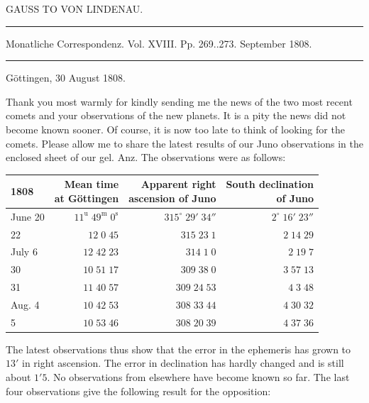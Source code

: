 \begin{center}
GAUSS TO VON LINDENAU.
\end{center}

\hrule
\begin{center}
\fontsize{10}{12}\selectfont Monatliche Correspondenz. Vol. XVIII. Pp. 269..273. September 1808.
\end{center}
\hrule

\begin{flushright}
Göttingen, 30 August 1808.
\end{flushright}

\par\indent Thank you most warmly for kindly sending me the news of the two most recent comets and your observations of the new planets. It is a pity the news did not become known sooner. Of course, it is now too late to think of looking for the comets. Please allow me to share the latest results of our Juno observations in the enclosed sheet of our gel. Anz. The observations were as follows:


\begin{center}\fontsize{10}{12}\selectfont\setlength{\tabcolsep}{3pt}\renewcommand{\arraystretch}{1.15}\begin{tabular}{lrrr}
1808 & \shortstack{Mean time\\at Göttingen} & \shortstack{Apparent right\\ascension of Juno} & \shortstack{South declination\\of Juno}\\\hline
June 20 & $11^{\text{u}}\;49^{\text{m}}\;0^{\text{s}}$ & $315^\circ\;29'\;34''$ & $2^\circ\;16'\;23''$\\
22 & $12\;0\;45$ & $315\;23\;1$ & $2\;14\;29$\\
July 6 & $12\;42\;23$ & $314\;1\;0$ & $2\;19\;7$\\
30 & $10\;51\;17$ & $309\;38\;0$ & $3\;57\;13$\\
31 & $11\;40\;57$ & $309\;24\;53$ & $4\;3\;48$\\
Aug. 4 & $10\;42\;53$ & $308\;33\;44$ & $4\;30\;32$\\
5 & $10\;53\;46$ & $308\;20\;39$ & $4\;37\;36$\\
\end{tabular}\end{center}


\par\indent The latest observations thus show that the error in the ephemeris has grown to $13'$ in right ascension. The error in declination has hardly changed and is still about $1'5$. No observations from elsewhere have become known so far. The last four observations give the following result for the opposition:

